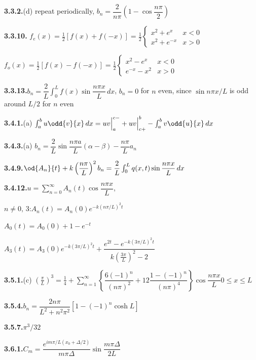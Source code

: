 \medskip
\textbf{3.3.2.}\quad (d) repeat periodically, $b_n = \dfrac{2}{n\pi}\left(1 - \cos\dfrac{n\pi}{2}\right)$

\medskip
\textbf{3.3.10.}\quad
$f_e(x) = \frac{1}{2}[f(x)+f(-x)] = \frac{1}{2}\begin{cases} x^2 + e^x & x < 0 \\ x^2 + e^{-x} & x > 0 \end{cases}$

$f_o(x) = \frac{1}{2}[f(x)-f(-x)] = \frac{1}{2}\begin{cases} x^2 - e^x & x < 0 \\ e^{-x} - x^2 & x > 0 \end{cases}$

\medskip
\textbf{3.3.13.}\quad $b_n = \dfrac{2}{L}\int_0^L f(x)\sin\dfrac{n\pi x}{L}\,dx$, $b_n = 0$ for $n$ even, since $\sin n\pi x/L$ is odd around $L/2$ for $n$ even

\medskip
\textbf{3.4.1.}\quad (a) $\int_a^b u\odd{v}{x}\,dx = uv\Big|_a^{c-} + uv\Big|_{c+}^b - \int_a^b v\odd{u}{x}\,dx$%

\medskip
\textbf{3.4.3.}\quad (a) $b_n = \dfrac{2}{L}\sin\dfrac{n\pi a}{L}(\alpha-\beta) - \dfrac{n\pi}{L}a_n$

\medskip
\textbf{3.4.9.}\quad $\od{A_n}{t} + k\left(\dfrac{n\pi}{L}\right)^2 b_n = \dfrac{2}{L}\int_0^L q(x,t)\sin\dfrac{n\pi x}{L}\,dx$

\medskip
\textbf{3.4.12.}\quad $u = \sum_{n=0}^{\infty} A_n(t)\cos\dfrac{n\pi x}{L}$,

$n \neq 0,\,3$:\quad $A_n(t) = A_n(0)e^{-k(n\pi/L)^2 t}$

$A_0(t) = A_0(0) + 1 - e^{-t}$

$A_3(t) = A_3(0)e^{-k(3\pi/L)^2 t} + \dfrac{e^{2t} - e^{-k(3\pi/L)^2 t}}{k(\frac{3\pi}{L})^2 - 2}$%

\medskip
\textbf{3.5.1.}\quad (c) $\left(\frac{\pi}{L}\right)^3 = \frac{1}{4} + \sum_{n=1}^{\infty}\left\{\dfrac{6(-1)^n}{(n\pi)^2} + 12\dfrac{1-(-1)^n}{(n\pi)^4}\right\}\cos\dfrac{n\pi x}{L}$\quad $0 \leq x \leq L$

\medskip
\textbf{3.5.4.}\quad $b_n = \dfrac{2n\pi}{L^2+n^2\pi^2}\left[1 - (-1)^n\cosh L\right]$

\medskip
\textbf{3.5.7.}\quad $\pi^3/32$

\medskip
\textbf{3.6.1.}\quad $C_m = \dfrac{e^{im\pi/L(x_0+\Delta/2)}}{m\pi\Delta}\sin\dfrac{m\pi\Delta}{2L}$

